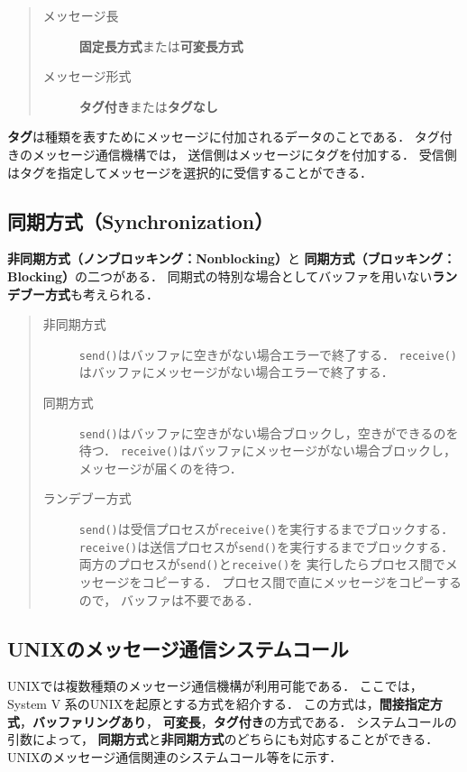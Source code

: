 \begin{quote}
\begin{description}
\item [メッセージ長] {\bf 固定長方式}または{\bf 可変長方式}
\item [メッセージ形式] {\bf タグ付き}または{\bf タグなし}
\end{description}
\end{quote}

{\bf タグ}は種類を表すためにメッセージに付加されるデータのことである．
タグ付きのメッセージ通信機構では，
送信側はメッセージにタグを付加する．
受信側はタグを指定してメッセージを選択的に受信することができる．

\subsection{同期方式（Synchronization）}
{\bf 非同期方式（ノンブロッキング：Nonblocking）}と
{\bf 同期方式（ブロッキング：Blocking）}の二つがある．
同期式の特別な場合としてバッファを用いない{\bf ランデブー方式}も考えられる．

\begin{quote}
\begin{description}
\item [非同期方式]
{\tt send()}はバッファに空きがない場合エラーで終了する．
{\tt receive()}はバッファにメッセージがない場合エラーで終了する．
\item [同期方式]
{\tt send()}はバッファに空きがない場合ブロックし，空きができるのを待つ．
{\tt receive()}はバッファにメッセージがない場合ブロックし，
メッセージが届くのを待つ．
\item [ランデブー方式]
{\tt send()}は受信プロセスが{\tt receive()}を実行するまでブロックする．
{\tt receive()}は送信プロセスが{\tt send()}を実行するまでブロックする．
両方のプロセスが{\tt send()}と{\tt receive()}を
実行したらプロセス間でメッセージをコピーする．
プロセス間で直にメッセージをコピーするので，
バッファは不要である．
\end{description}
\end{quote}

\subsection{UNIXのメッセージ通信システムコール}
UNIXでは複数種類のメッセージ通信機構が利用可能である．
ここでは，System V 系のUNIXを起原とする方式を紹介する．
この方式は，{\bf 間接指定方式}，{\bf バッファリングあり}，
{\bf 可変長}，{\bf タグ付き}の方式である．
システムコールの引数によって，
{\bf 同期方式}と{\bf 非同期方式}のどちらにも対応することができる．
UNIXのメッセージ通信関連のシステムコール等をに示す．

